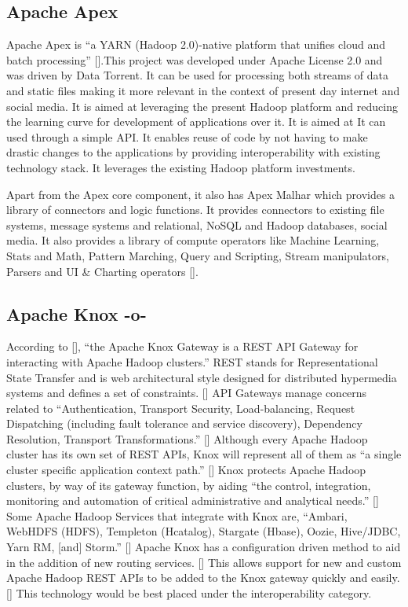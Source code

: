 \subsection{Apache Apex}
     
Apache Apex is ``a YARN (Hadoop 2.0)-native platform that unifies
cloud and batch processing'' [\cite{www-apacheapexwiki}].This project
was developed under Apache License 2.0 and was driven by Data
Torrent. It can be used for processing both streams of data and static
files making it more relevant in the context of present day internet
and social media. It is aimed at leveraging the present Hadoop
platform and reducing the learning curve for development of
applications over it. It is aimed at It can used through a simple
API. It enables reuse of code by not having to make drastic changes to
the applications by providing interoperability with existing
technology stack. It leverages the existing Hadoop platform
investments.

Apart from the Apex core component, it also has Apex Malhar which
provides a library of connectors and logic functions. It provides
connectors to existing file systems, message systems and relational,
NoSQL and Hadoop databases, social media. It also provides a library
of compute operators like Machine Learning, Stats and Math, Pattern
Marching, Query and Scripting, Stream manipulators, Parsers and UI \&
Charting operators [\cite{www-apacheapexblog}].

\subsection{Apache Knox -o-}

According to [\cite{knox}], ``the Apache Knox Gateway is a REST API
Gateway for interacting with Apache Hadoop clusters.'' REST stands for
Representational State Transfer and is web architectural style
designed for distributed hypermedia systems and defines a set of
constraints. [\cite{fielding}] API Gateways manage concerns related to
``Authentication, Transport Security, Load-balancing, Request
Dispatching (including fault tolerance and service discovery),
Dependency Resolution, Transport Transformations.'' [\cite{peyrott}]
Although every Apache Hadoop cluster has its own set of REST APIs,
Knox will represent all of them as ``a single cluster specific
application context path.'' [\cite{knox}] Knox protects Apache Hadoop
clusters, by way of its gateway function, by aiding ``the control,
integration, monitoring and automation of critical administrative and
analytical needs.'' [\cite{knox}] Some Apache Hadoop Services that
integrate with Knox are, ``Ambari, WebHDFS (HDFS), Templeton
(Hcatalog), Stargate (Hbase), Oozie, Hive/JDBC, Yarn RM, [and]
Storm.'' [\cite{knox}] Apache Knox has a configuration driven method to
aid in the addition of new routing services. [\cite{knox}] This allows
support for new and custom Apache Hadoop REST APIs to be added to the
Knox gateway quickly and easily. [\cite{knox}] This technology would be
best placed under the interoperability category.

